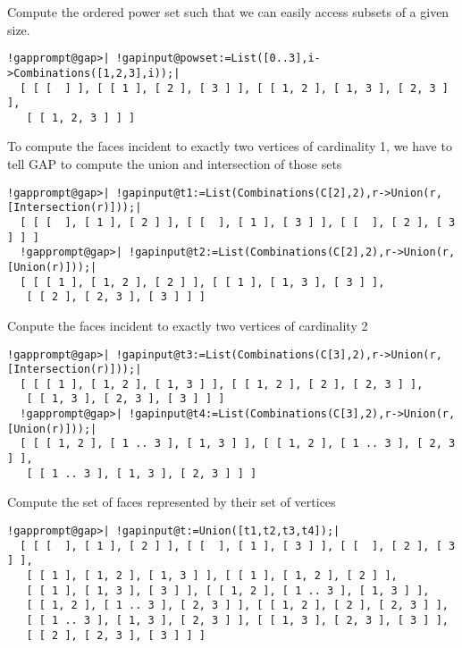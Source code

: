 \documentclass[a4paper,11pt]{report}
\begin{document}
{{{ 
\begin{center}

\end{center}
 

 Compute the ordered power set such that we can easily access subsets of a
given size. 
\begin{Verbatim}[commandchars=!@|,fontsize=\small,frame=single,label=Example]
  !gapprompt@gap>| !gapinput@powset:=List([0..3],i->Combinations([1,2,3],i));|
  [ [ [  ] ], [ [ 1 ], [ 2 ], [ 3 ] ], [ [ 1, 2 ], [ 1, 3 ], [ 2, 3 ] ], 
   [ [ 1, 2, 3 ] ] ]
\end{Verbatim}
 

 To compute the faces incident to exactly two vertices of cardinality 1, we
have to tell GAP to compute the union and intersection of those sets 

 
\begin{Verbatim}[commandchars=!@|,fontsize=\small,frame=single,label=Example]
  !gapprompt@gap>| !gapinput@t1:=List(Combinations(C[2],2),r->Union(r, [Intersection(r)]));|
  [ [ [  ], [ 1 ], [ 2 ] ], [ [  ], [ 1 ], [ 3 ] ], [ [  ], [ 2 ], [ 3 ] ] ]
  !gapprompt@gap>| !gapinput@t2:=List(Combinations(C[2],2),r->Union(r, [Union(r)]));|
  [ [ [ 1 ], [ 1, 2 ], [ 2 ] ], [ [ 1 ], [ 1, 3 ], [ 3 ] ], 
   [ [ 2 ], [ 2, 3 ], [ 3 ] ] ]
\end{Verbatim}
 

 Conpute the faces incident to exactly two vertices of cardinality 2 

 
\begin{Verbatim}[commandchars=!@|,fontsize=\small,frame=single,label=Example]
  !gapprompt@gap>| !gapinput@t3:=List(Combinations(C[3],2),r->Union(r, [Intersection(r)]));|
  [ [ [ 1 ], [ 1, 2 ], [ 1, 3 ] ], [ [ 1, 2 ], [ 2 ], [ 2, 3 ] ], 
   [ [ 1, 3 ], [ 2, 3 ], [ 3 ] ] ]
  !gapprompt@gap>| !gapinput@t4:=List(Combinations(C[3],2),r->Union(r, [Union(r)]));|
  [ [ [ 1, 2 ], [ 1 .. 3 ], [ 1, 3 ] ], [ [ 1, 2 ], [ 1 .. 3 ], [ 2, 3 ] ], 
   [ [ 1 .. 3 ], [ 1, 3 ], [ 2, 3 ] ] ]
\end{Verbatim}
 

 Compute the set of faces represented by their set of vertices 

 
\begin{Verbatim}[commandchars=!@|,fontsize=\small,frame=single,label=Example]
  !gapprompt@gap>| !gapinput@t:=Union([t1,t2,t3,t4]);|
  [ [ [  ], [ 1 ], [ 2 ] ], [ [  ], [ 1 ], [ 3 ] ], [ [  ], [ 2 ], [ 3 ] ], 
   [ [ 1 ], [ 1, 2 ], [ 1, 3 ] ], [ [ 1 ], [ 1, 2 ], [ 2 ] ], 
   [ [ 1 ], [ 1, 3 ], [ 3 ] ], [ [ 1, 2 ], [ 1 .. 3 ], [ 1, 3 ] ], 
   [ [ 1, 2 ], [ 1 .. 3 ], [ 2, 3 ] ], [ [ 1, 2 ], [ 2 ], [ 2, 3 ] ], 
   [ [ 1 .. 3 ], [ 1, 3 ], [ 2, 3 ] ], [ [ 1, 3 ], [ 2, 3 ], [ 3 ] ], 
   [ [ 2 ], [ 2, 3 ], [ 3 ] ] ]
\end{Verbatim}
 

}}}
\end{document}
